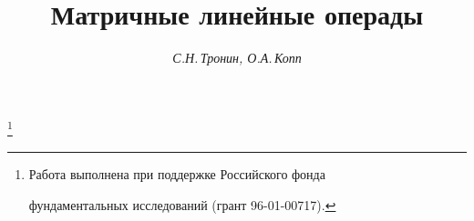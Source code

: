 




% 





\newcommand{\Sep}{\operatorname{Sep}}


\newcommand{\Alg}{\operatorname{Alg}}


\newcommand{\Mod}{\operatorname{Mod}}


\newcommand{\Id}{\operatorname{Id}}


\newcommand{\Map}{\operatorname{Map}}


\newcommand{\tts}[1]{}







\setcounter{page}{53}















\author{\it С.Н.\,Тронин, О.А.\,Копп}




\title{Матричные линейные операды}


\thanks{Работа выполнена при поддержке Российского фонда


фундаментальных исследований (грант 96-01-00717).}





\date{}




\pagestyle{plain} %





